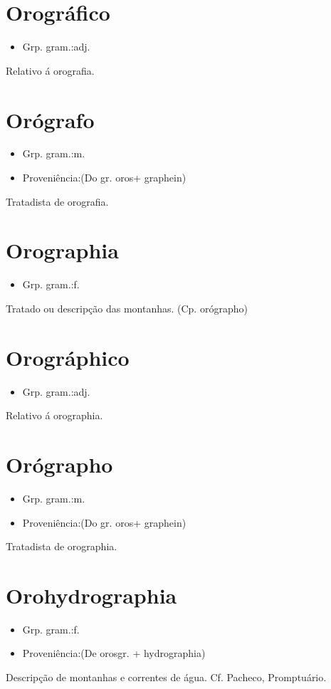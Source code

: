 \section{Orográfico}
\begin{itemize}
\item {Grp. gram.:adj.}
\end{itemize}
Relativo á orografia.
\section{Orógrafo}
\begin{itemize}
\item {Grp. gram.:m.}
\end{itemize}
\begin{itemize}
\item {Proveniência:(Do gr. \textunderscore oros\textunderscore  + \textunderscore graphein\textunderscore )}
\end{itemize}
Tratadista de orografia.
\section{Orographia}
\begin{itemize}
\item {Grp. gram.:f.}
\end{itemize}
Tratado ou descripção das montanhas.
(Cp. \textunderscore orógrapho\textunderscore )
\section{Orográphico}
\begin{itemize}
\item {Grp. gram.:adj.}
\end{itemize}
Relativo á orographia.
\section{Orógrapho}
\begin{itemize}
\item {Grp. gram.:m.}
\end{itemize}
\begin{itemize}
\item {Proveniência:(Do gr. \textunderscore oros\textunderscore  + \textunderscore graphein\textunderscore )}
\end{itemize}
Tratadista de orographia.
\section{Orohydrographia}
\begin{itemize}
\item {Grp. gram.:f.}
\end{itemize}
\begin{itemize}
\item {Proveniência:(De \textunderscore oros\textunderscore  gr. + \textunderscore hydrographia\textunderscore )}
\end{itemize}
Descripção de montanhas e correntes de água. Cf. Pacheco, \textunderscore Promptuário\textunderscore .
